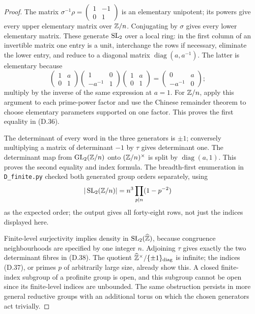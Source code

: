 \begin{proof}
The matrix \(\sigma^{-1}\rho=
\left(\begin{smallmatrix}1&-1\\0&1\end{smallmatrix}\right)\)
is an elementary unipotent; its powers give every upper
elementary matrix over \(\mathbb Z/n\).
Conjugating by \(\sigma\) gives every lower elementary
matrix.  These generate \(\operatorname{SL}_2\) over a local ring:
in the first column of an invertible matrix one entry is
a unit, interchange the rows if necessary, eliminate the
lower entry, and reduce to a diagonal matrix
\(\operatorname{diag}(a,a^{-1})\).
The latter is elementary because
\[
 \begin{pmatrix}1&a\\0&1\end{pmatrix}
 \begin{pmatrix}1&0\\-a^{-1}&1\end{pmatrix}
 \begin{pmatrix}1&a\\0&1\end{pmatrix}
 =\begin{pmatrix}0&a\\-a^{-1}&0\end{pmatrix};
\]
multiply by the inverse of the same expression at \(a=1\).
For \(\mathbb Z/n\), apply this argument to each prime-power
factor and use the Chinese remainder theorem to choose
elementary parameters supported on one factor.
This proves the first equality in (D.36).

The determinant of every word in the three generators is
\(\pm1\); conversely multiplying a matrix of determinant
\(-1\) by \(\tau\) gives determinant one.
The determinant map from \(\operatorname{GL}_2(\mathbb Z/n)\) onto
\((\mathbb Z/n)^\times\) is split by \(\operatorname{diag}(a,1)\).
This proves the second equality and index formula.
The breadth-first enumeration in \texttt{D\_finite.py}
checked both generated group orders separately, using
\[
 |\operatorname{SL}_2(\mathbb Z/n)|=n^3\prod_{p\mid n}(1-p^{-2})
\]
as the expected order; the output gives all forty-eight
rows, not just the indices displayed here.

Finite-level surjectivity implies density in
\(\operatorname{SL}_2(\widehat{\mathbb Z})\), because congruence neighbourhoods
are specified by one integer \(n\).
Adjoining \(\tau\) gives exactly the two determinant fibres
in (D.38).  The quotient
\(\widehat{\mathbb Z}^\times/\{\pm1\}_{\mathrm{diag}}\) is infinite;
the indices (D.37), or primes \(p\) of arbitrarily large
size, already show this.  A closed finite-index subgroup
of a profinite group is open, and this subgroup cannot be
open since its finite-level indices are unbounded.
The same obstruction persists in more general reductive
groups with an additional torus on which the chosen
generators act trivially.
\end{proof}

